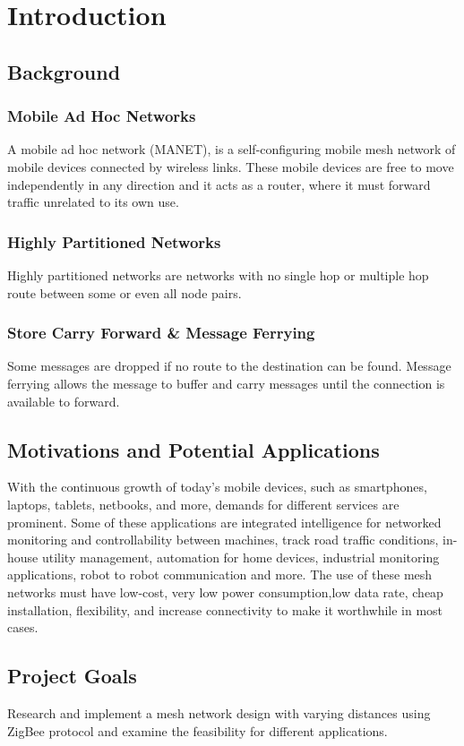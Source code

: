 \chapter{Introduction} 

\section{Background}

\subsection{Mobile Ad Hoc Networks}
A mobile ad hoc network (MANET),  is a self-configuring mobile mesh network of mobile devices connected by wireless links.  
These mobile devices are free to move independently in any direction and it acts as a router, where it must forward traffic unrelated to its own use. 

\subsection{Highly Partitioned Networks}
Highly partitioned networks are networks with no single hop or multiple hop route between some or even all node pairs.

\subsection{Store Carry Forward \& Message Ferrying}
Some messages are dropped if no route to the destination can be found.  
Message ferrying allows the message to buffer and carry messages until the connection is available to forward.

\section{Motivations and Potential Applications}

With the continuous growth of today's mobile devices, such as smartphones, laptops, tablets, netbooks, and more, demands for different services are prominent. 
Some of these applications are integrated intelligence for networked monitoring and controllability between machines, track road traffic conditions, in-house utility management, automation for home devices, industrial monitoring applications, robot to robot communication and more.  
The use of these mesh networks must have low-cost, very low power consumption,low data rate, cheap installation, flexibility, and increase connectivity to make it worthwhile in most cases.


\section{Project Goals}
Research and implement a mesh network design with varying distances using ZigBee protocol and examine the feasibility for different applications.